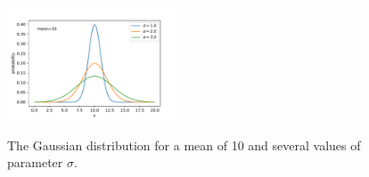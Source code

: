 \documentclass[12pt]{article}
\begin{document}
\begin{figure}[htbp]
\begin{center}
{\includegraphics[width=0.45\textwidth]{figs/chap_dist_gaussian.pdf}}
\end{center}
\caption{\label{fig:poisson}  The Gaussian distribution for a mean of 10 and several values of parameter $\sigma$.}
\end{figure}
\end{document}
